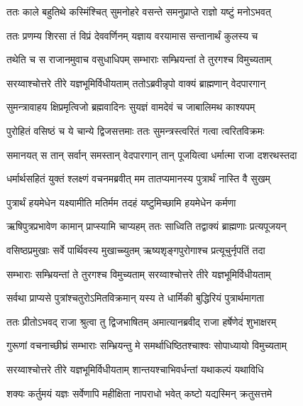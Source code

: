 
\twolineshloka
{ततः काले बहुतिथे कस्मिंश्चित् सुमनोहरे}
{वसन्ते समनुप्राप्ते राज्ञो यष्टुं मनोऽभवत्} %

\twolineshloka
{ततः प्रणम्य शिरसा तं विप्रं देववर्णिनम्}
{यज्ञाय वरयामास सन्तानार्थं कुलस्य च} %

\twolineshloka
{तथेति च स राजानमुवाच वसुधाधिपम्}
{सम्भाराः सम्भ्रियन्तां ते तुरगश्च विमुच्यताम्} %

\twolineshloka
{सरय्वाश्चोत्तरे तीरे यज्ञभूमिर्विधीयताम्}
{ततोऽब्रवीन्नृपो वाक्यं ब्राह्मणान् वेदपारगान्} %

\twolineshloka
{सुमन्त्रावाहय क्षिप्रमृत्विजो ब्रह्मवादिनः}
{सुयज्ञं वामदेवं च जाबालिमथ काश्यपम्} %

\twolineshloka
{पुरोहितं वसिष्ठं च ये चान्ये द्विजसत्तमाः}
{ततः सुमन्त्रस्त्वरितं गत्वा त्वरितविक्रमः} %

\twolineshloka
{समानयत् स तान् सर्वान् समस्तान् वेदपारगान्}
{तान् पूजयित्वा धर्मात्मा राजा दशरथस्तदा} %

\twolineshloka
{धर्मार्थसहितं युक्तं श्लक्ष्णं वचनमब्रवीत्}
{मम तातप्यमानस्य पुत्रार्थं नास्ति वै सुखम्} %

\twolineshloka
{पुत्रार्थं हयमेधेन यक्ष्यामीति मतिर्मम}
{तदहं यष्टुमिच्छामि हयमेधेन कर्मणा} %

\twolineshloka
{ऋषिपुत्रप्रभावेण कामान् प्राप्स्यामि चाप्यहम्}
{ततः साध्विति तद्वाक्यं ब्राह्मणाः प्रत्यपूजयन्} %

\twolineshloka
{वसिष्ठप्रमुखाः सर्वे पार्थिवस्य मुखाच्च्युतम्}
{ऋष्यशृङ्गपुरोगाश्च प्रत्यूचुर्नृपतिं तदा} %

\twolineshloka
{सम्भाराः सम्भ्रियन्तां ते तुरगश्च विमुच्यताम्}
{सरय्वाश्चोत्तरे तीरे यज्ञभूमिर्विधीयताम्} %

\twolineshloka
{सर्वथा प्राप्यसे पुत्रांश्चतुरोऽमितविक्रमान्}
{यस्य ते धार्मिकी बुद्धिरियं पुत्रार्थमागता} %

\twolineshloka
{ततः प्रीतोऽभवद् राजा श्रुत्वा तु द्विजभाषितम्}
{अमात्यानब्रवीद् राजा हर्षेणेदं शुभाक्षरम्} %

\twolineshloka
{गुरूणां वचनाच्छीघ्रं सम्भाराः सम्भ्रियन्तु मे}
{समर्थाधिष्ठितश्चाश्वः सोपाध्यायो विमुच्यताम्} %

\twolineshloka
{सरय्वाश्चोत्तरे तीरे यज्ञभूमिर्विधीयताम्}
{शान्तयश्चाभिवर्धन्तां यथाकल्पं यथाविधि} %

\twolineshloka
{शक्यः कर्तुमयं यज्ञः सर्वेणापि महीक्षिता}
{नापराधो भवेत् कष्टो यद्यस्मिन् क्रतुसत्तमे} %

